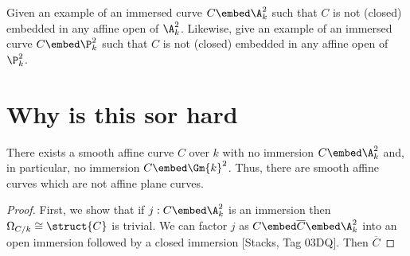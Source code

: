\documentclass[12pt]{article}
\begin{document}
\begin{exercise}
Given an example of an immersed curve $C \embed \A^2_k$ such that $C$ is not (closed) embedded in any affine open of $\A^2_k$. Likewise, give an example of an immersed curve $C \embed \P^2_k$ such that $C$ is not (closed) embedded in any affine open of $\P^2_k$.
\end{exercise}

\section{Why is this sor hard}


\begin{prop}
There exists a smooth affine curve $C$ over $k$ with no immersion $C \embed \A^2_k$ and, in particular, no immersion $C \embed \Gm{k}^2$. Thus, there are smooth affine curves which are not affine plane curves. 
\end{prop}

\begin{proof}
First, we show that if $j : C \embed \A^2_k$ is an immersion then $\Omega_{C/k} \cong \struct{C}$ is trivial. We can factor $j$ as $C \embed \overline{C} \embed \A^2_k$ into an open immersion followed by a closed immersion [Stacks, Tag 03DQ]. Then $\overline{C}$ 
\end{proof}
\end{document}
